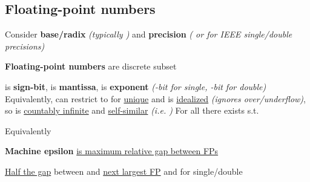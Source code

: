 \subsection*{Floating-point numbers}

Consider \textbf{base/radix}  \emph{(typically
      )} and \textbf{precision}  \emph{(
      or  for IEEE single/double precisions)}

\textbf{Floating-point numbers} are discrete subset
\begin{itemize}

      \vItem
             is \textbf{sign-bit},  is
            \textbf{mantissa},  is \textbf{exponent}
            \emph{(-bit for single, -bit for double)}
      \vItem
            Equivalently, can restrict to
             for \ul{unique}  and
      \vItem
             is \ul{idealized} 
            \emph{(ignores over/underflow)}, so is \ul{countably infinite} and \ul{self-similar}
            \emph{(i.e. )}
      \vItem
            For all  there exists  s.t.

            \begin{itemize}
                  \vItem
                        Equivalently
            \end{itemize}
\end{itemize}

\textbf{Machine epsilon}
\ul{is maximum relative gap between FPs}
\begin{itemize}
      \vItem
            \ul{Half the gap} between  and \ul{next largest FP}
      \vItem
             and
             for single/double
\end{itemize}

\hSep %

